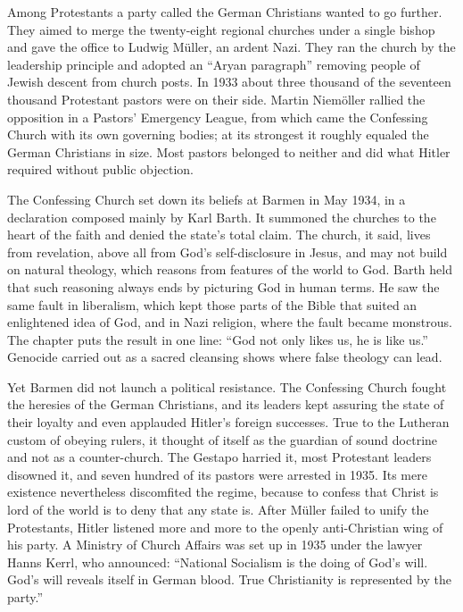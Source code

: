 Among Protestants a party called the German Christians wanted to go further. They aimed to merge the
twenty-eight regional churches under a single bishop and gave the office to Ludwig M\"uller, an
ardent Nazi. They ran the church by the leadership principle and adopted an ``Aryan paragraph''
removing people of Jewish descent from church posts. In 1933 about three thousand of the seventeen
thousand Protestant pastors were on their side. Martin Niem\"oller rallied the opposition in a
Pastors' Emergency League, from which came the Confessing Church with its own governing bodies; at
its strongest it roughly equaled the German Christians in size. Most pastors belonged to neither and
did what Hitler required without public objection.

The Confessing Church set down its beliefs at Barmen in May 1934, in a declaration composed mainly by
Karl Barth. It summoned the churches to the heart of the faith and denied the state's total claim.
The church, it said, lives from revelation, above all from God's self-disclosure in Jesus, and may
not build on natural theology, which reasons from features of the world to God. Barth held that such
reasoning always ends by picturing God in human terms. He saw the same fault in liberalism, which
kept those parts of the Bible that suited an enlightened idea of God, and in Nazi religion, where the
fault became monstrous. The chapter puts the result in one line: ``God not only likes us, he is like us.'' Genocide carried out as a sacred cleansing shows where false theology can lead.

Yet Barmen did not launch a political resistance. The Confessing Church fought the heresies of the
German Christians, and its leaders kept assuring the state of their loyalty and even applauded
Hitler's foreign successes. True to the Lutheran custom of obeying rulers, it thought of itself as
the guardian of sound doctrine and not as a counter-church. The Gestapo harried it, most Protestant
leaders disowned it, and seven hundred of its pastors were arrested in 1935. Its mere existence
nevertheless discomfited the regime, because to confess that Christ is lord of the world is to deny
that any state is. After M\"uller failed to unify the Protestants, Hitler listened more and more to
the openly anti-Christian wing of his party. A Ministry of Church Affairs was set up in 1935 under
the lawyer Hanns Kerrl, who announced: ``National Socialism is the doing of God's will. God's will
reveals itself in German blood. True Christianity is represented by the party.''

